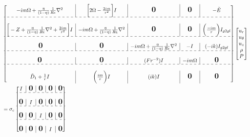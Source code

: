 \documentclass{article}
\newcommand{\bigzero}{\mbox{\normalfont\Large\bfseries 0}}
\newcommand{\rvline}{\hspace*{-\arraycolsep}\vline\hspace*{-\arraycolsep}}
\begin{document}
\begin{align}\label{eq:hoc_interpolate_face_to_center_naive}
 \begin{split}
 &\begin{bmatrix}
    -im\Omega +  \frac{\eta}{(1-\eta)} \frac{1}{Re} \nabla^{2} 
   & \rvline 
  & 
  \bigg[2\Omega - \frac{2im}{r^{2}}\bigg] I
  & \rvline
  & \bigzero 
  & \rvline 
  & \bigzero
  &\rvline
  & -\tilde{E}\\
\hdashline \\
%
\bigg[-Z + \frac{\eta}{(1-\eta)} \frac{1}{Re} \nabla^{2} + \frac{2im}{r^{2}}\bigg] I 
& \rvline 
& -im\Omega +  \frac{\eta}{(1-\eta)} \frac{1}{Re}\nabla^{2} 
&\rvline 
& \bigzero & \rvline &  \bigzero & \rvline & \bigg(\frac{-im}{r}\bigg)I_{g2gl}\\
%
\hdashline\\\
%
  \bigzero & \rvline & \bigzero &\rvline & -im\Omega +  \frac{\eta}{(1-\eta)} \frac{1}{Re}\nabla^{2} & \rvline & -I & \rvline & (-ik)I_{g2gl}\\
%
\hdashline\\
%
  \bigzero & \rvline & \bigzero &\rvline & (Fr^{-2})I & \rvline & -im\Omega & \rvline & \bigzero\\
\hdashline\\
  \tilde{D}_{1} + \frac{1}{r}I & \rvline & \bigg(\frac{im}{r}\bigg)I &\rvline & (ik)I & \rvline & \bigzero & \rvline & \bigzero\\
\end{bmatrix}
\begin{bmatrix}
 u_{r}\\
 u_{\theta}\\
 u_{z}\\
 \rho\\
 P\\
 \end{bmatrix}\\
&= \sigma_{c} 
\begin{bmatrix}
 I & \rvline & \bigzero & \rvline & \bigzero & \rvline & \bigzero
  &\rvline & \bigzero\\
\hdashline \\
%
 \bigzero & \rvline & I &\rvline & \bigzero & \rvline & \bigzero & \rvline & \bigzero\\
%
\hdashline\\
%
  \bigzero & \rvline & \bigzero &\rvline & I & \rvline & \bigzero & \rvline & \bigzero\\
%
\hdashline\\
%
  \bigzero & \rvline & \bigzero &\rvline & \bigzero & \rvline & I & \rvline & \bigzero\\

\end{bmatrix}
\end{split}
\end{align}
\end{document}
